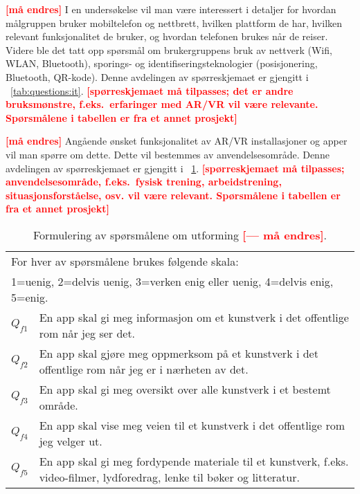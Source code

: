 \documentclass[11pt,english]{nik}
\newcommand{\WVL}[1]{\textbf{\textcolor{red}{#1}}}
\begin{document}

\WVL{[må endres]}
I en undersøkelse vil man være interessert i detaljer for hvordan målgruppen
bruker mobiltelefon og nettbrett, hvilken plattform de har, hvilken
relevant funksjonalitet de bruker, og hvordan telefonen brukes når de
reiser.  Videre ble det tatt opp spørsmål om brukergruppens bruk av
nettverk (Wifi, WLAN, Bluetooth), sporings- og
identifiseringsteknologier (posisjonering, Bluetooth, QR-kode).
Denne avdelingen
av spørreskjemaet er gjengitt i \tablename~\ref{tab:questions:it}.
\WVL{[spørreskjemaet må tilpasses; det er andre bruksmønstre, 
f.eks.\ erfaringer med AR/VR vil være relevante. Spørsmålene i tabellen er fra et annet prosjekt]}



\WVL{[må endres]}
Angående ønsket funksjonalitet av AR/VR installasjoner og apper vil man spørre om dette. 
Dette vil bestemmes av anvendelsesområde.
Denne avdelingen
av spørreskjemaet er gjengitt i \tablename~\ref{tab:questions:utforming}.
\WVL{[spørreskjemaet må tilpasses; 
anvendelsesområde, f.eks.\ fysisk trening, arbeidstrening, situasjonsforståelse, osv. vil være relevant.
Spørsmålene i tabellen er fra et annet prosjekt]}


\begin{table}
    \caption{Formulering av spørsmålene om utforming \WVL{[--- må endres]}.} \label{tab:questions:utforming}
\centering\small
\begin{tabular}{lp{.9\hsize}}
\multicolumn{2}{p{.99\hsize}}{For hver av spørsmålene brukes følgende skala:}\\ 
\multicolumn{2}{p{.99\hsize}}{1=uenig, 2=delvis uenig, 3=verken enig eller uenig, 4=delvis enig, 5=enig.}\\
\hline
\(Q_{f1}\) & En app skal gi meg informasjon om et kunstverk i det offentlige rom når jeg ser det. \\
\(Q_{f2}\) & En app skal gjøre meg oppmerksom på et kunstverk i det offentlige rom når jeg er i
nærheten av det. \\
\(Q_{f3}\) & En app skal gi meg oversikt over alle kunstverk i et bestemt område. \\
\(Q_{f4}\) & En app skal vise meg veien til et kunstverk i det offentlige rom jeg velger ut. \\
\(Q_{f5}\) & En app skal gi meg fordypende materiale til et kunstverk, f.eks. video-filmer, lydforedrag,
lenke til bøker og litteratur.
\end{tabular}
\end{table}
\end{document}
